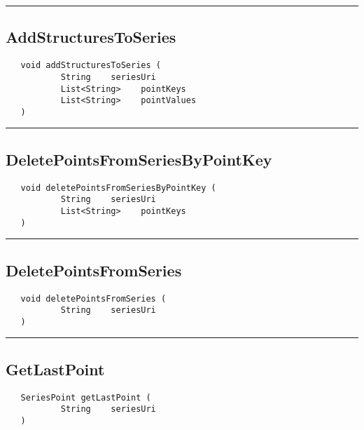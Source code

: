 \rule{15cm}{2pt}
\subsection{AddStructuresToSeries}
\label{Api:AddStructuresToSeries}
\begin{verbatim}
   void addStructuresToSeries (
           String    seriesUri
           List<String>    pointKeys
           List<String>    pointValues
   )
\end{verbatim}



\rule{15cm}{2pt}
\subsection{DeletePointsFromSeriesByPointKey}
\label{Api:DeletePointsFromSeriesByPointKey}
\begin{verbatim}
   void deletePointsFromSeriesByPointKey (
           String    seriesUri
           List<String>    pointKeys
   )
\end{verbatim}



\rule{15cm}{2pt}
\subsection{DeletePointsFromSeries}
\label{Api:DeletePointsFromSeries}
\begin{verbatim}
   void deletePointsFromSeries (
           String    seriesUri
   )
\end{verbatim}



\rule{15cm}{2pt}
\subsection{GetLastPoint}
\label{Api:GetLastPoint}
\begin{verbatim}
   SeriesPoint getLastPoint (
           String    seriesUri
   )
\end{verbatim}



